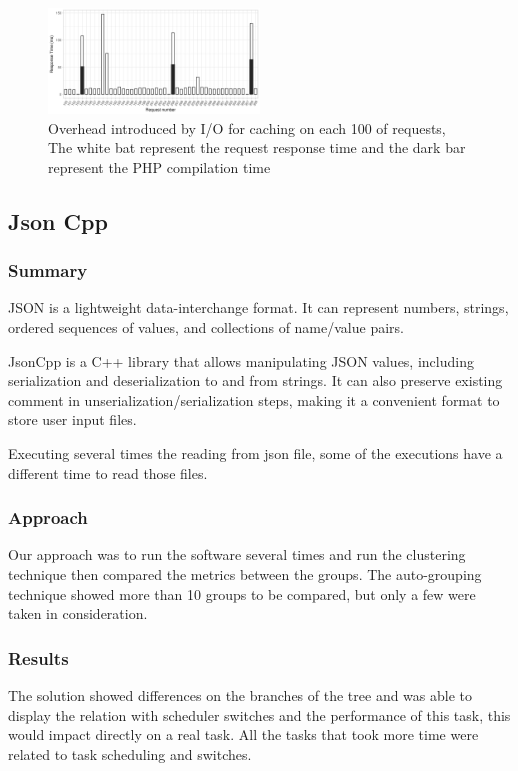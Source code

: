     \begin{figure}[h]
      \centering
        \includegraphics[width=0.50\textwidth]{figures/server-time-series-bar.png}
        \caption{Overhead introduced by I/O for caching on each 100 of requests, The white bat represent the request response time and the dark bar represent the PHP compilation time}
        \label{fig:server-time-series}
    \end{figure}
    
    
\subsection{Json Cpp}
\subsubsection{Summary}
    JSON is a lightweight data-interchange format. It can represent numbers, strings, ordered sequences of values, and collections of name/value pairs.

    JsonCpp is a C++ library that allows manipulating JSON values, including serialization and deserialization to and from strings. It can also preserve existing comment in unserialization/serialization steps, making it a convenient format to store user input files.
    
    Executing several times the reading from json file, some of the executions have a different time to read those files.    
    
\subsubsection{Approach}
    Our approach was to run the software several times and run the clustering technique then compared the metrics between the groups.
    The auto-grouping technique showed more than 10 groups to be compared, but only a few were taken in consideration.
    
\subsubsection{Results}
    The solution showed differences on the branches of the tree and was able to display the relation with scheduler switches and the performance of this task, this would impact directly on a real task. All the tasks that took more time were related to task scheduling and switches.
    

